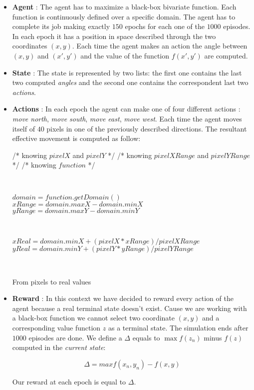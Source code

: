 \begin{itemize}
	\item \textbf{Agent} : The agent has to maximize a black-box bivariate function. Each function is continuously defined over a specific domain. The agent has to complete its job making exactly $150$ epochs for each one of the $1000$ episodes. In each epoch it has a position in space described through the two coordinates $(x, y)$. Each time the agent makes an action the angle between $(x, y)$ and $(x', y')$ and the value of the function $f(x', y')$ are computed.
	\item \textbf{State} : The state is represented by two lists: the first one contains the last two computed \textit{angles} and the second one contains the correspondent last two \textit{actions}.
	\item \textbf{Actions} : In each epoch the agent can make one of four different actions : \textit{move north}, \textit{move  south}, \textit{move east}, \textit{move west}. Each time the agent moves itself of $40$ pixels in one of the previously described directions. The resultant effective movement is computed as follow:
	
	\begin{algorithm} [h!]
		/* knowing $pixelX$ and $pixelY$ */\;
		/* knowing $pixelXRange$ and $pixelYRange$ */ \;
		/* knowing $function$ */\;
		
		\
		
		$domain = function.getDomain()$ \;
		$xRange = domain.maxX - domain.minX$ \;
		$yRange = domain.maxY - domain.minY$ \;
		
		\
		
		$xReal = domain.minX + (pixelX * xRange) / pixelXRange$ \;
		$yReal = domain.minY + (pixelY * yRange) / pixelYRange$ \;
		
		\
		
		\caption{From pixels to real values} 
	\end{algorithm}
	
	\item \textbf{Reward} : In this context we have decided to reward every action of the agent because a real terminal state doesn't exist. Cause we are working with a black-box function we cannot select two coordinate $(x, y)$ and a corresponding value function $z$ as a terminal state. The simulation ends after $1000$ episodes are done. We define a $\Delta$ equals to $\max f(z_n)$ minus $f(z)$ computed in the \textit{current state}:
	
	\begin{equation}
		\Delta = max f(x_n, y_n) - f(x, y)
	\end{equation} 
	
	Our reward at each epoch is equal to $\Delta$.
\end{itemize}

